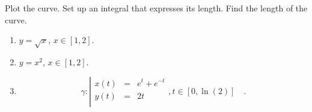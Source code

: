 Plot the curve. Set up an integral that expresses its length. Find the length of the curve. 
\begin{enumerate}
\item $y=\sqrt{x}$, $x\in [1, 2]$.
\item $y=x^2$, $x\in [1, 2]$.
\item 
\begin{equation*}
\gamma:\left| 
\begin{array}{rcl}
x(t)&=&e^t+e^{-t}\\
y(t)&=&2t\\
\end{array}\right., t\in [0,\ln(2)]\quad .
\end{equation*}
\end{enumerate}
